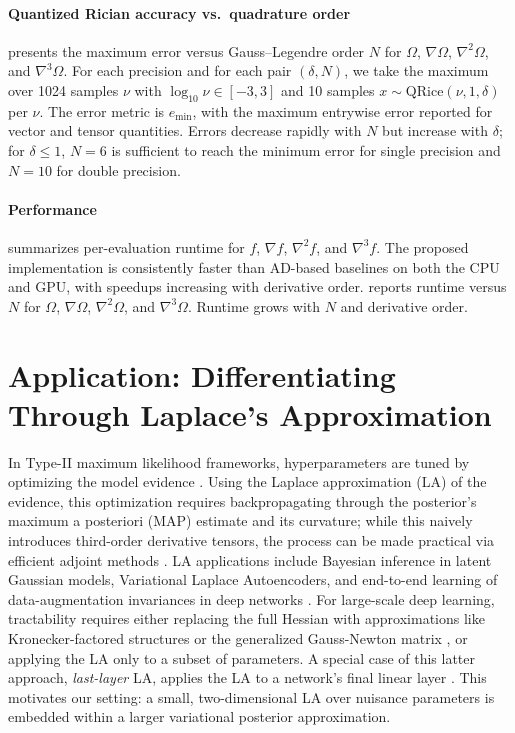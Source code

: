 \documentclass{article}
\begin{document}
\paragraph{Quantized Rician accuracy vs.\ quadrature order}

 presents the maximum error versus Gauss--Legendre order $N$ for $\Omega$, $\nabla\Omega$, $\nabla^2\Omega$, and $\nabla^3\Omega$.
For each precision and for each pair $(\delta, N)$, we take the maximum over 1024 samples $\nu$ with $\log_{10} \nu \in [-3, 3]$ and 10 samples $x \sim \mathrm{QRice}(\nu, 1, \delta)$ per $\nu$.
The error metric is $e_{\min}$, with the maximum entrywise error reported for vector and tensor quantities.
Errors decrease rapidly with $N$ but increase with $\delta$; for $\delta \le 1$, $N=6$ is sufficient to reach the minimum error for single precision and $N=10$ for double precision.

\paragraph{Performance}

 summarizes per-evaluation runtime for $f$, $\nabla f$, $\nabla^2 f$, and $\nabla^3 f$.
The proposed implementation is consistently faster than AD-based baselines on both the CPU and GPU, with speedups increasing with derivative order.
 reports runtime versus $N$ for $\Omega$, $\nabla\Omega$, $\nabla^2\Omega$, and $\nabla^3\Omega$.
Runtime grows with $N$ and derivative order.

\section{Application: Differentiating Through Laplace's Approximation}

In Type-II maximum likelihood frameworks, hyperparameters are tuned by optimizing the model evidence \citep{mackay_bayesian_1992}.
Using the Laplace approximation (LA) of the evidence, this optimization requires backpropagating through the posterior's maximum a posteriori (MAP) estimate and its curvature;
while this naively introduces third-order derivative tensors, the process can be made practical via efficient adjoint methods \citep{margossian_hamiltonian_2020}.
LA applications include Bayesian inference in latent Gaussian models, Variational Laplace Autoencoders, and end-to-end learning of data-augmentation invariances in deep networks \citep{margossian_hamiltonian_2020, park_variational_2019, immer_invariance_2022}.
For large-scale deep learning, tractability requires either replacing the full Hessian with approximations like Kronecker-factored structures or the generalized Gauss-Newton matrix \citep{ritter_scalable_2018, immer_improving_2021}, or applying the LA only to a subset of parameters.
A special case of this latter approach, \textit{last-layer} LA, applies the LA to a network's final linear layer \citep{kristiadi_being_2020, daxberger_laplace_2021}.
This motivates our setting:
a small, two-dimensional LA over nuisance parameters is embedded within a larger variational posterior approximation.
\end{document}
